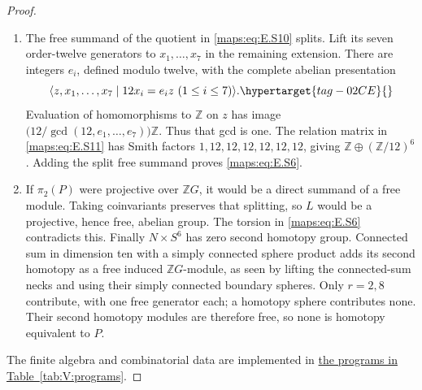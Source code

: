\documentclass[11pt,a4paper]{article}
\numberwithin{equation}{section}
\theoremstyle{definition}
\begin{document}
\begin{proof}
\begin{enumerate}[label=\arabic*.,leftmargin=*]
\item The free summand of the quotient in \eqref{maps:eq:E.S10} splits. Lift its
seven order-twelve generators to $x_1,\ldots,x_7$ in the
remaining extension. There are integers $e_i$, defined modulo
twelve, with the complete abelian presentation
\begin{equation}
        \langle z,x_1,\ldots,x_7\mid
                      12x_i=e_i z\ (1\leq i\leq7)\rangle.
 \hypertarget{tag-02CE}{}\label{maps:eq:E.S11}
\end{equation}
Evaluation of homomorphisms to $\mathbb Z$ on $z$ has image
$\bigl(12/\gcd(12,e_1,\ldots,e_7)\bigr)\mathbb Z$.
Thus that gcd is one. The relation matrix in \eqref{maps:eq:E.S11} has
Smith factors $1,12,12,12,12,12,12$, giving
$\mathbb Z\oplus(\mathbb Z/12)^6$. Adding the split free
summand proves \eqref{maps:eq:E.S6}.

\item If $\pi_2(P)$ were projective over $\mathbb ZG$, it would be
a direct summand of a free module. Taking coinvariants preserves
that splitting, so $L$ would be a projective, hence free,
abelian group. The torsion in \eqref{maps:eq:E.S6} contradicts this. Finally
$N\times S^6$ has zero second homotopy group. Connected sum in
dimension ten with a simply connected sphere product adds its
second homotopy as a free induced $\mathbb ZG$-module, as seen
by lifting the connected-sum necks and using their simply
connected boundary spheres. Only $r=2,8$ contribute, with one
free generator each; a homotopy sphere contributes none.
Their second homotopy modules are therefore free, so none is
homotopy equivalent to $P$.

\end{enumerate}
The finite algebra and combinatorial data are implemented in \hyperlink{prog:V:equivariant}{the programs in Table~\ref*{tab:V:programs}}.
\end{proof}
\end{document}
